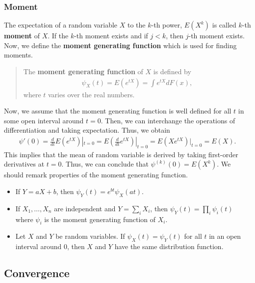 \documentclass[
  12pt,
]{article}
\providecommand{\tightlist}{%
  \setlength{\itemsep}{0pt}\setlength{\parskip}{0pt}}
\begin{document}
\hypertarget{moment}{%
\subsubsection{Moment}\label{moment}}

The expectation of a random variable \(X\) to the \(k\)-th power,
\(E(X^k)\) is called \(k\)-th \textbf{moment} of \(X\). If the \(k\)-th
moment exists and if \(j < k\), then \(j\)-th moment exists. Now, we
define the \textbf{moment generating function} which is used for finding
moments.

\begin{quote}
The \textbf{moment generating function} of \(X\) is defined by
\begin{align*}
\psi_X(t) = E(e^{tX}) = \int e^{tX} dF(x),
\end{align*} where \(t\) varies over the real numbers.
\end{quote}

Now, we assume that the moment generating function is well defined for
all \(t\) in some open interval around \(t = 0\). Then, we can
interchange the operations of differentiation and taking expectation.
Thus, we obtain \begin{align*}
  \psi'(0) 
  = \frac{d}{dt} E(e^{tX})|_{t = 0} 
  = E \left( \frac{d}{dt} e^{tX} \right) |_{t = 0}
  = E (X e^{tX})|_{t = 0} 
  = E(X).
\end{align*} This implies that the mean of random variable is derived by
taking first-order derivatives at \(t = 0\). Thus, we can conclude that
\(\psi^{(k)}(0) = E(X^k)\). We should remark properties of the moment
generating function.

\begin{itemize}
\tightlist
\item
  If \(Y = a X + b\), then \(\psi_Y(t) = e^{bt} \psi_X(at)\).
\item
  If \(X_1, \ldots, X_n\) are independent and \(Y = \sum_i X_i\), then
  \(\psi_Y(t) = \prod_i \psi_i (t)\) where \(\psi_i\) is the moment
  generating function of \(X_i\).
\item
  Let \(X\) and \(Y\) be random variables. If \(\psi_X(t) = \psi_Y(t)\)
  for all \(t\) in an open interval around 0, then \(X\) and \(Y\) have
  the same distribution function.
\end{itemize}

\hypertarget{convergence}{%
\subsection{Convergence}\label{convergence}}
\end{document}
